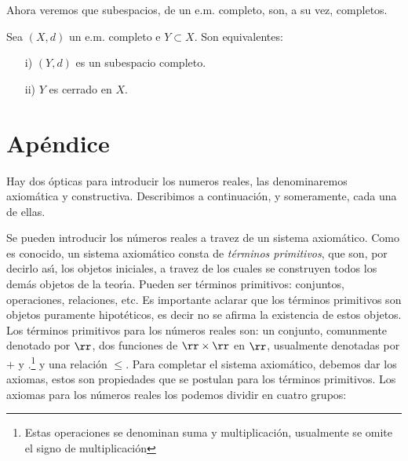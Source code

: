 Ahora veremos que subespacios, de un e.m. completo, son, a su vez,
completos.

\begin{proposicion} Sea $(X,d)$ un e.m. completo e $Y\subset X$.
Son equivalentes:
\begin{itemize}
\item[i)] $(Y,d)$ es un subespacio completo.
\item[ii)] $Y$ es cerrado en $X$.
\end{itemize}
\end{proposicion}



\section{Ap\'endice}\label{sec,apendice}
 Hay dos \'opticas para introducir los numeros
 reales, las denominaremos axiom\'atica y constructiva.
 Describimos a continuaci\'on, y someramente, cada una de ellas.

 Se pueden introducir los n\'umeros reales a travez de un sistema
 axiom\'atico. Como es conocido, un sistema axiom\'atico consta de
 \emph{t\'erminos primitivos}, que son, por decirlo as\'{\i}, los
 objetos iniciales, a travez de los cuales se construyen todos los
 dem\'as objetos de la teor\'{\i}a. Pueden ser t\'erminos
 primitivos: conjuntos, operaciones, relaciones, etc. Es importante
 aclarar que los t\'erminos primitivos son objetos puramente
 hipot\'eticos, es decir no se afirma la existencia de estos
 objetos. Los t\'erminos primitivos para los n\'umeros reales son:
 un conjunto, comunmente denotado por $\rr$, dos funciones de
  $\rr\times\rr$ en $\rr$, usualmente denotadas por $+$ y $.$\footnote
  {Estas operaciones se denominan suma y multiplicaci\'on,
  usualmente se omite el signo de multiplicaci\'on} y una relaci\'on
  $\leq$. Para completar el sistema axiom\'atico,
  debemos dar los axiomas, estos son propiedades que se postulan
  para los t\'erminos primitivos. Los axiomas para los n\'umeros
  reales los podemos dividir en cuatro grupos:

